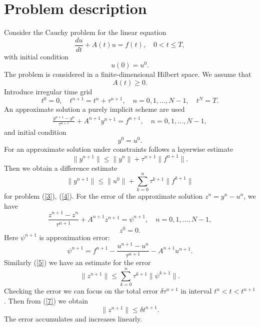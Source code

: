 \documentclass[runningheads]{llncs}
\begin{document}
\section{Problem description}
Consider the Cauchy problem for the linear equation
\begin{equation}\label{1}
\frac{du}{dt} + A(t)u =f(t), \quad 0 < t \leq T,
\end{equation}
with initial condition
\begin{equation}\label{2}
u(0) = u^0.
\end{equation}
The problem is considered in a finite-dimensional Hilbert space.
We assume that
\[
A(t) \geq 0.
\]
Introduce irregular time grid
\[
t^0 = 0, \quad t^{n+1} = t^n + \tau^{n+1}, \quad 
n = 0, 1, ... , N-1, \quad t^N = T.
\]
An approximate solution a purely implicit scheme are used
\begin{equation}\label{3}
\begin{split}
  \frac{y^{n+1} - y^{n}}{\tau^{n+1}} + A^{n+1} y^{n+1} = f^{n+1},
  \quad n = 0,1, ..., N-1, 
\end{split}
\end{equation}
and initial condition
\begin{equation}\label{4}
 y^0 = u^0.
\end{equation} 
For an approximate solution under constraints follows a layerwise estimate
\[
 \|y^{n+1}\| \leq \|y^{n}\| + \tau^{n+1} \|f^{n+1}\| .
\]
Then we obtain a difference estimate
\begin{equation}\label{5}
 \|y^{n+1}\| \leq \|u^{0}\| + \sum_{k=0}^{n} \tau^{k+1} \|f^{k+1}\|
\end{equation}
for problem (\ref{3}), (\ref{4}).
For the error of the approximate solution $z^n = y^n - u^n$, we have
\[
  \frac{z^{n+1} - z^{n}}{\tau^{n+1}} + A^{n+1} z^{n+1} = \psi^{n+1},
  \quad n = 0,1, ..., N-1,  
\] 
\[
 z^0 = 0.
\]
Here $\psi^{n+1}$ is approximation error:
\begin{equation}\label{6}
 \psi^{n+1} = f^{n+1} -
 \frac{u^{n+1} - u^{n}}{\tau^{n+1}} - A^{n+1} u^{n+1} . 
\end{equation}
Similarly (\ref{5}) we have an estimate for the error
\begin{equation}\label{7}
  \|z^{n+1}\| \leq \sum_{k=0}^{n} \tau^{k+1} \|\psi^{k+1}\| .
\end{equation} 
Checking the error we can focus on the total error $\delta\tau^{n+1}$ in interval $t^n < t < t^{n+1}$. Then from (\ref{7}) we obtain
\[
 \|z^{n+1}\| \leq \delta t^{n+1}.
\]
The error accumulates and increases linearly.
\end{document}
